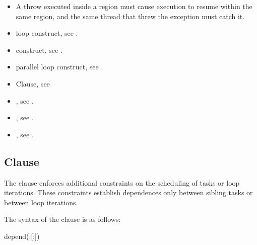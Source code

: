 \begin{cppspecific}
\begin{itemize}
\item A throw executed inside a  region must cause execution to
resume within the same  region, and the same thread that threw
the exception must catch it.
\end{itemize}
\end{cppspecific}



\crossreferences
\begin{itemize}
\item loop construct, see
.

\item {} construct, see
.

\item parallel loop construct, see
.

\item {} Clause, see

\item {}, see
.

\item {}, see
.

\item {}, see
.

\end{itemize}


\subsection{ Clause}
\label{subsec:depend Clause}
\summary
The  clause enforces additional constraints on the scheduling of tasks or loop iterations.  These
constraints establish dependences only between sibling tasks or between loop iterations.

\syntax
The syntax of the  clause is as follows:

\begin{ompSyntax}
depend(:[:])
\end{ompSyntax}

